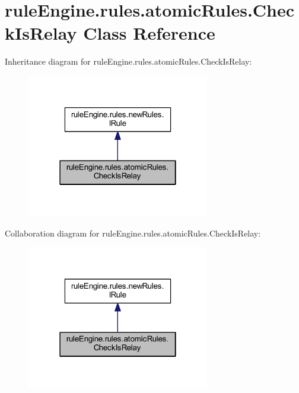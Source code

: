 \hypertarget{classrule_engine_1_1rules_1_1atomic_rules_1_1_check_is_relay}{}\section{rule\+Engine.\+rules.\+atomic\+Rules.\+Check\+Is\+Relay Class Reference}
\label{classrule_engine_1_1rules_1_1atomic_rules_1_1_check_is_relay}


Inheritance diagram for rule\+Engine.\+rules.\+atomic\+Rules.\+Check\+Is\+Relay\+:
\nopagebreak
\begin{figure}[H]
\begin{center}
\leavevmode
\includegraphics[width=226pt]{classrule_engine_1_1rules_1_1atomic_rules_1_1_check_is_relay__inherit__graph}
\end{center}
\end{figure}


Collaboration diagram for rule\+Engine.\+rules.\+atomic\+Rules.\+Check\+Is\+Relay\+:
\nopagebreak
\begin{figure}[H]
\begin{center}
\leavevmode
\includegraphics[width=226pt]{classrule_engine_1_1rules_1_1atomic_rules_1_1_check_is_relay__coll__graph}
\end{center}
\end{figure}
